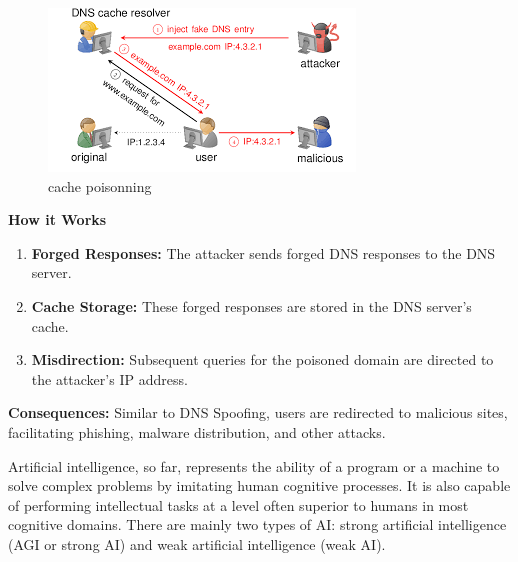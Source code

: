 \begin{figure}[ht!]
	\centering
	\includegraphics[width=0.5\linewidth]{chap1/images/cache poisning.png}
	\caption{cache poisonning\cite{datadog2023dns}}
	\label{fig:enter-label}
\end{figure}
\textbf{How it Works\\}
\begin{enumerate}        
	\item \textbf{Forged Responses:} The attacker sends forged DNS responses to the DNS server.
	\item \textbf{Cache Storage:} These forged responses are stored in the DNS server's cache.
	\item \textbf{Misdirection:} Subsequent queries for the poisoned domain are directed to the attacker's IP address.
\end{enumerate}
\textbf{Consequences:}
Similar to DNS Spoofing, users are redirected to malicious sites, facilitating phishing, malware distribution, and other attacks.



Artificial intelligence, so far, represents the ability of a program or a machine to solve complex problems by imitating human cognitive processes. It is also capable of performing intellectual tasks at a level often superior to humans in most cognitive domains. There are mainly two types of AI: strong artificial intelligence (AGI or strong AI) and weak artificial intelligence (weak AI).




